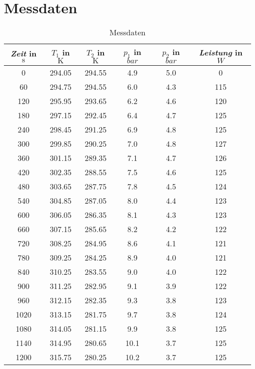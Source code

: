 \section{Messdaten}
\begin{table}
   \small
   \centering
   \caption{Messdaten}
   \label{tab:Messdaten}
   \begin{tabular}{S[table-format=3.0] S[table-format=1.1] S[table-format=1.1] S[table-format=1.2] S[table-format=1.2] S[table-format=3.0]}
       \toprule
       {\emph{Zeit} in $\si{\second}$} & {$T_1$ in $\si{\kelvin}$} & {$T_2$ in $\si{\kelvin}$} & {$p_1$ in $\si{bar}$} & {$p_2$ in $\si{bar}$} & {\emph{Leistung} in $\si{W}$} \\
        & 294.05 & 294.55 & 4.9 & 5.0 & 0 \\
       60 & 294.75 & 294.55 & 6.0 & 4.3 & 115 \\
       120 & 295.95 & 293.65 & 6.2 & 4.6 & 120 \\
       180 & 297.15 & 292.45 & 6.4 & 4.7 & 125 \\
       240 & 298.45 & 291.25 & 6.9 & 4.8 & 125 \\
       300 & 299.85 & 290.25 & 7.0 & 4.8 & 127 \\
       360 & 301.15 & 289.35 & 7.1 & 4.7 & 126 \\
       420 & 302.35 & 288.55 & 7.5 & 4.6 & 125 \\
       480 & 303.65 & 287.75 & 7.8 & 4.5 & 124 \\
       540 & 304.85 & 287.05 & 8.0 & 4.4 & 123 \\
       600 & 306.05 & 286.35 & 8.1 & 4.3 & 123 \\
       660 & 307.15 & 285.65 & 8.2 & 4.2 & 122 \\
       720 & 308.25 & 284.95 & 8.6 & 4.1 & 121 \\
       780 & 309.25 & 284.25 & 8.9 & 4.0 & 121 \\
       840 & 310.25 & 283.55 & 9.0 & 4.0 & 122 \\
       900 & 311.25 & 282.95 & 9.1 & 3.9 & 122 \\
       960 & 312.15 & 282.35 & 9.3 & 3.8 & 123 \\
       1020 & 313.15 & 281.75 & 9.7 & 3.8 & 124 \\
       1080 & 314.05 & 281.15 & 9.9 & 3.8 & 125 \\
       1140 & 314.95 & 280.65 & 10.1 & 3.7 & 125 \\
       1200 & 315.75 & 280.25 & 10.2 & 3.7 & 125 \\

\end{tabular}
\end{table}
